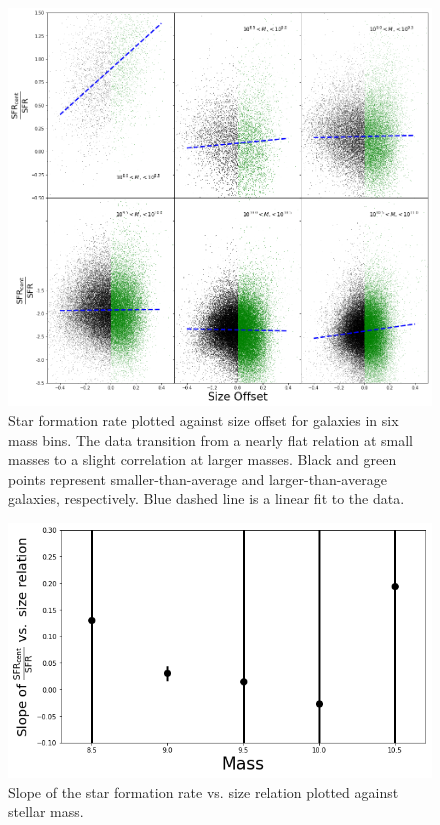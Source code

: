 \documentclass[iop]{emulateapj}
\begin{document}
\begin{figure}
	\centering
	\includegraphics[width=1.5 \columnwidth]{excess_2x3.png}
	\caption{Star formation rate plotted against size offset for galaxies in six mass bins. The data transition from a nearly flat relation at small masses to a slight correlation at larger masses. Black and green points represent smaller-than-average and larger-than-average galaxies, respectively. Blue dashed line is a linear fit to the data.}
	\label{fig:sfr_ex}
	
\end{figure}

\begin{figure}
	\centering
	\includegraphics[width= \columnwidth]{slope_cent_excess.png}
	\caption{Slope of the star formation rate vs. size relation plotted against stellar mass.}
	\label{fig:HA_ex_mass}
	
\end{figure}
\end{document}
